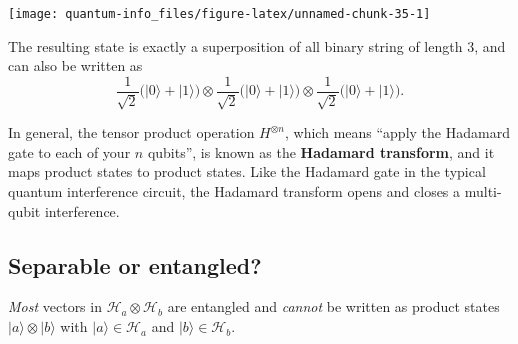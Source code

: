 \documentclass[fleqn]{article}
\newenvironment{idea}{\noindent}{\medskip}
\begin{document}
\begin{center}\texttt{[image: quantum-info\_files/figure-latex/unnamed-chunk-35-1]} \end{center}

The resulting state is exactly a superposition of all binary string of length 3, and can also be written as
\[
  \frac{1}{\sqrt2} \big(|0\rangle + |1\rangle\big)
  \otimes
  \frac{1}{\sqrt2} \big(|0\rangle + |1\rangle\big)
  \otimes
  \frac{1}{\sqrt2} \big(|0\rangle + |1\rangle\big).
\]

In general, the tensor product operation \(H^{\otimes n}\), which means ``apply the Hadamard gate to each of your \(n\) qubits'', is known as the \textbf{Hadamard transform}, and it maps product states to product states.
Like the Hadamard gate in the typical quantum interference circuit, the Hadamard transform opens and closes a multi-qubit interference.

\hypertarget{separable-or-entangled}{%
\subsection{Separable or entangled?}\label{separable-or-entangled}}

\begin{idea}

\emph{Most} vectors in \(\mathcal{H}_a\otimes \mathcal{H}_b\) are entangled and \emph{cannot} be written as product states \(|a\rangle\otimes|b\rangle\) with \(|a\rangle\in\mathcal{H}_a\) and \(|b\rangle\in\mathcal{H}_b\).

\end{idea}
\end{document}
